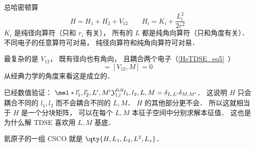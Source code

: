 
总哈密顿算
\begin{equation}
H = H_1 + H_2 + V_{12} \qquad H_i = K_i + \frac{L_i^2}{2r^2}
\end{equation}
$K_i$ 是纯径向算符（只和 $r_i$ 有关）， 所有的 $L$ 都是纯角向算符（只和角度有关）． 不同电子的任意算符可对易， 纯径向算符和纯角向算符可对易．

最复杂的是 $V_{12}$， 既有径向也有角向， 且耦合两个电子（\autoref{HeTDSE_eq5}~）
\begin{equation}
[V_{12}, L^2] = [V_{12}, M] = 0
\end{equation}
从经典力学的角度来看这是成立的．

已经数值验证： $\mel*{l'_1,l'_2,L',M'}{\mathcal Y_{l,l}^{0,0}}{l_1,l_2,L,M} = \delta_{L,L'}\delta_{M,M'}$． 这说明 $H$ 只会耦合不同的 $l_1,l_2$ 而不会耦合不同的 $L,M$． $H$ 的其他部分更不会． 所以这就相当于 $H$ 是一个分块矩阵， 可以在每个 $L,M$ 本征子空间中分别求解本征值． 这也是为什么解 TDSE 喜欢用 $L,M$ 基底．

氦原子的一组 CSCO 就是 $\qty{H,L_1,L_2,L^2,L_z}$．
